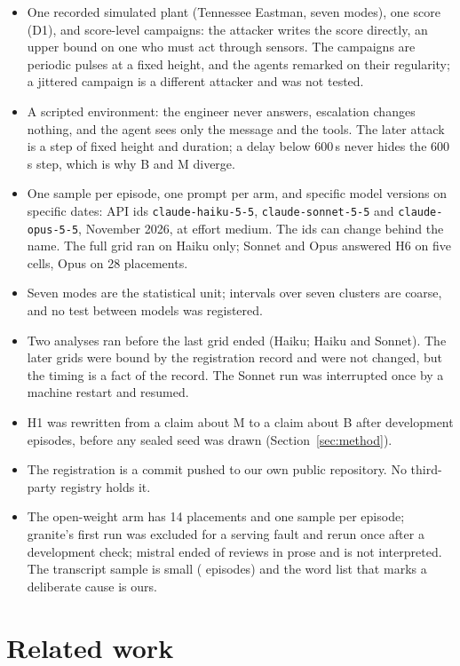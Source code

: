 \documentclass[sigconf]{acmart}
\begin{document}
\begin{itemize}
\item One recorded simulated plant (Tennessee Eastman, seven modes), one score (D1), and score-level
  campaigns: the attacker writes the score directly, an upper bound on one who must act through sensors.
  The campaigns are periodic pulses at a fixed height, and the agents remarked on their regularity; a
  jittered campaign is a different attacker and was not tested.
\item A scripted environment: the engineer never answers, escalation changes nothing, and the agent sees
  only the message and the tools. The later attack is a step of fixed height and duration; a delay
  below 600\,s never hides the 600\,s step, which is why B and M diverge.
\item One sample per episode, one prompt per arm, and specific model versions on specific dates: API ids
  \texttt{claude-haiku-5-5}, \texttt{claude-sonnet-5-5} and \texttt{claude-opus-5-5}, November 2026, at
  effort medium. The ids can change behind the name. The full grid ran on Haiku only; Sonnet and Opus
  answered H6 on five cells, Opus on 28 placements.
\item Seven modes are the statistical unit; intervals over seven clusters are coarse, and no test between
  models was registered.
\item Two analyses ran before the last grid ended (Haiku; Haiku and Sonnet). The later grids were bound by
  the registration record and were not changed, but the timing is a fact of the record. The Sonnet run was
  interrupted once by a machine restart and resumed.
\item H1 was rewritten from a claim about M to a claim about B after development episodes, before any
  sealed seed was drawn (Section~\ref{sec:method}).
\item The registration is a commit pushed to our own public repository. No third-party registry holds it.
\item The open-weight arm has 14 placements and one sample per episode; granite's first run was excluded
  for a serving fault and rerun once after a development check; mistral ended \VOWMistralProse{} of
  \VOWMistralReviews{} reviews in prose and is not interpreted. The transcript sample is small (\VQEp{}
  episodes) and the word list that marks a deliberate cause is ours.
\end{itemize}

\section{Related work}
\label{sec:related}
\end{document}
